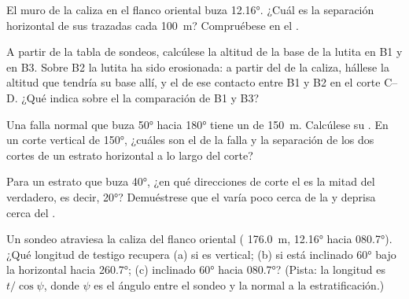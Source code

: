 \begin{exercise}[$\star\star$]\label{exo:b1:cross-sections:7}
El muro de la caliza en el flanco oriental buza \ang{12.16}. ¿Cuál es la separación horizontal de
sus  trazadas cada \qty{100}{m}? Compruébese en el .
\end{exercise}

\begin{exercise}[$\star\star$]\label{exo:b1:cross-sections:8}
A partir de la tabla de sondeos, calcúlese la altitud de la base de la lutita en B1 y en B3. Sobre
B2 la lutita ha sido erosionada: a partir del  de la caliza, hállese la altitud que
tendría su base allí, y el  de ese contacto entre B1 y B2 en el corte C--D.
¿Qué indica sobre el  la comparación de B1 y B3?
\end{exercise}

\begin{exercise}[$\star\star$]\label{exo:b1:cross-sections:9}
Una falla normal que buza \ang{50} hacia \ang{180} tiene un  de \qty{150}{m}. Calcúlese
su . En un corte vertical de  \ang{150}, ¿cuáles son el  de
la falla y la separación de los dos cortes de un estrato horizontal a lo largo del corte?
\end{exercise}

\begin{exercise}[$\star\star\star$]\label{exo:b1:cross-sections:10}
Para un estrato que buza \ang{40}, ¿en qué direcciones de corte el  es la mitad
del verdadero, es decir, \ang{20}? Demuéstrese que el  varía poco cerca de la
 y deprisa cerca del .
\end{exercise}

\begin{exercise}[$\star\star\star$]\label{exo:b1:cross-sections:11}
Un sondeo atraviesa la caliza del flanco oriental ( \qty{176.0}{m}, 
\ang{12.16} hacia \ang{080.7}). ¿Qué longitud de testigo recupera (a) si es vertical; (b) si está
inclinado \ang{60} bajo la horizontal hacia \ang{260.7}; (c) inclinado \ang{60} hacia \ang{080.7}?
(Pista: la longitud es $t/\cos\psi$, donde $\psi$ es el ángulo entre el sondeo y la normal a la
estratificación.)
\end{exercise}

